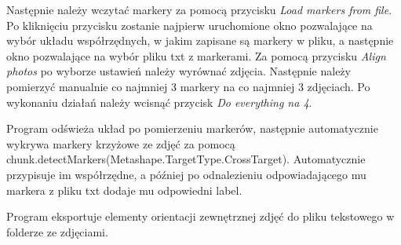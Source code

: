 \documentclass{article}
\begin{document}
Następnie należy wczytać markery za pomocą przycisku \textit{Load markers from file}. Po kliknięciu przycisku zostanie najpierw uruchomione okno pozwalające na wybór układu współrzędnych, w jakim zapisane są markery w pliku, a następnie okno pozwalające na wybór pliku txt z markerami. Za pomocą przycisku \textit{Align photos} po wyborze ustawień należy wyrównać zdjęcia. Następnie należy pomierzyć manualnie co najmniej 3 markery na co najmniej 3 zdjęciach. Po wykonaniu działań należy wcisnąć przycisk \textit{Do everything na 4}.

Program odświeża układ po pomierzeniu markerów, następnie automatycznie wykrywa markery krzyżowe ze zdjęć za pomocą chunk.detectMarkers(Metashape.TargetType.CrossTarget). Automatycznie przypisuje im współrzędne, a później po odnalezieniu odpowiadającego mu markera z pliku txt dodaje mu odpowiedni label.

Program eksportuje elementy orientacji zewnętrznej zdjęć do pliku tekstowego w folderze ze zdjęciami.
\end{document}
